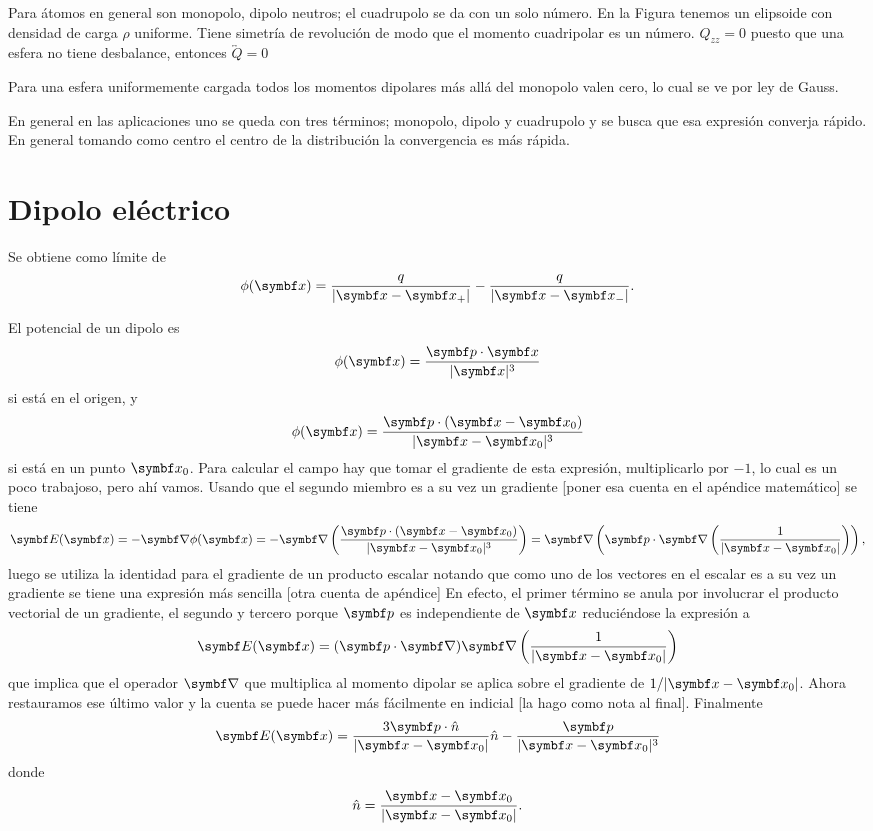 \documentclass[10pt,oneside]{CBFT_book}
\begin{document}
Para átomos en general son monopolo, dipolo neutros; el cuadrupolo se da con un solo número. 
En la Figura tenemos un elipsoide con densidad de carga $\rho$ uniforme. Tiene simetría de revolución
de modo que el momento cuadripolar es un número. $Q_{zz} = 0 $ puesto que una esfera no tiene
desbalance, entonces $\overleftrightarrow{Q} = 0 $ 

Para una esfera uniformemente cargada todos los momentos dipolares más allá del monopolo valen
cero, lo cual se ve por ley de Gauss.

En general en las aplicaciones uno se queda con tres términos; monopolo, dipolo y cuadrupolo y se
busca que esa expresión converja rápido. En general tomando como centro el centro de la distribución
la convergencia es más rápida.


\section{Dipolo eléctrico}

Se obtiene como límite de 
\[
	\phi(\vb{x}) = \frac{ q }{| \vbx - \vbx_+ |}  - \frac{ q }{| \vbx - \vbx_- |}.
\]

El potencial de un dipolo es
\[
	\phi(\vb{x}) = \frac{ \vb{p}\cdot\vb{x} }{|\vb{x}|^3} 
\]
si está en el origen, y
\[
	\phi(\vb{x}) = \frac{ \vb{p}\cdot(\vb{x}-\vb{x}_0) }{|\vb{x} - \vb{x}_0|^3} 
\]
si está en un punto $\vb{x}_0$. Para calcular el campo hay que tomar el gradiente de esta expresión,
multiplicarlo por $-1$, lo cual es un poco trabajoso, pero ahí vamos.
Usando que el segundo miembro es a su vez un gradiente [poner esa cuenta en el apéndice matemático]
se tiene 
\[
	\vb{E}(\vb{x}) = -\Nabla \phi(\vbx) = 
	-\Nabla \left( \frac{ \vb{p}\cdot(\vb{x}-\vb{x}_0) }{|\vb{x} - \vb{x}_0|^3} \right) =
	\Nabla \left( \vb{p} \cdot \Nabla\left( \frac{ 1 }{|\vb{x} - \vb{x}_0|} \right) \right),
\]
luego se utiliza la identidad para el gradiente de un producto escalar notando que como uno de
los vectores en el escalar es a su vez un gradiente se tiene una expresión más sencilla 
[otra cuenta de apéndice]
En efecto, el primer término se anula por involucrar el producto vectorial de un gradiente, el
segundo y tercero porque $\vb{p}$ es independiente de $\vbx$ reduciéndose la expresión a
\[
	\vb{E}(\vb{x}) = (\vb{p}\cdot\Nabla) \Nabla\left( \frac{ 1 }{|\vb{x} - \vb{x}_0|} \right)
\]
que implica que el operador $\Nabla$ que multiplica al momento dipolar se aplica sobre el gradiente
de $1/|\vb{x} - \vb{x}_0|$. Ahora restauramos ese último valor y la cuenta se 
puede hacer más fácilmente en indicial [la hago como nota al final]. 
Finalmente
\[
	\vb{E}(\vb{x}) = \frac{3 \vb{p}\cdot\hat{n} }{|\vb{x} - \vb{x}_0|}  \hat{n} - 
		\frac{ \vb{p} }{|\vb{x} - \vb{x}_0|^3}	
\]
donde 
\[
	\hat{n} = \frac{\vb{x}-\vb{x}_0}{|\vb{x}-\vb{x}_0|}.
\]
\end{document}
